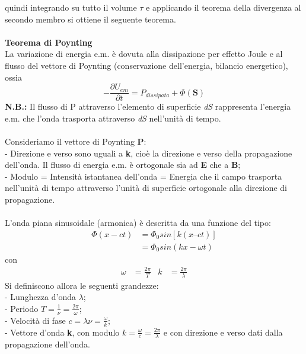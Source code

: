 \documentclass{article}
\begin{document}
quindi integrando su tutto il volume $\tau$ e applicando il teorema della divergenza al secondo membro si ottiene il seguente teorema.\\
\\
\textbf{Teorema di Poynting}\\
La variazione di energia e.m. è dovuta alla dissipazione per effetto Joule e al flusso del vettore di Poynting (conservazione dell’energia, bilancio energetico), ossia
\begin{equation}
-\frac{\partial U_{em}}{\partial t} = P_{dissipata} + \Phi(\textbf{S})
\end{equation}
\textbf{N.B.:} Il flusso di P attraverso l’elemento di superficie \emph{dS} rappresenta l’energia e.m. che l’onda trasporta attraverso \emph{dS} nell’unità di tempo.\\
\\
Consideriamo il vettore di Poynting \textbf{P}:\\
- Direzione e verso sono uguali a \textbf{k}, cioè la direzione e verso della
propagazione dell’onda. Il flusso di energia e.m. è ortogonale sia ad \textbf{E} che a \textbf{B};\\
- Modulo = Intensità istantanea dell’onda = Energia che il campo trasporta nell’unità di tempo attraverso l’unità di superficie ortogonale alla direzione di propagazione.\\
\\
L’onda piana sinusoidale (armonica) è descritta da una funzione del tipo:
\begin{equation}
\begin{split}
\Phi (x-ct)&=\Phi_0 sin[k(x – ct)] \\
&=\Phi_0 sin(kx - \omega t)
\nonumber
\end{split}
\end{equation}
con
\begin{align*}
\omega &=\frac{2\pi}{T} & k&=\frac{2\pi}{\lambda}
\nonumber
\end{align*}
Si definiscono allora le seguenti grandezze:\\
- Lunghezza d'onda $\lambda $; \\
- Periodo $T=\frac{1}{\nu}=\frac{2\pi}{\omega}$;\\
- Velocità di fase $c=\lambda \nu = \frac{\omega}{k}$;\\
- Vettore d'onda \textbf{k}, con modulo $k=\frac{\omega}{c}= \frac{2\pi}{\lambda}$ e con direzione e verso dati dalla propagazione dell'onda.\\
\\
\end{document}
